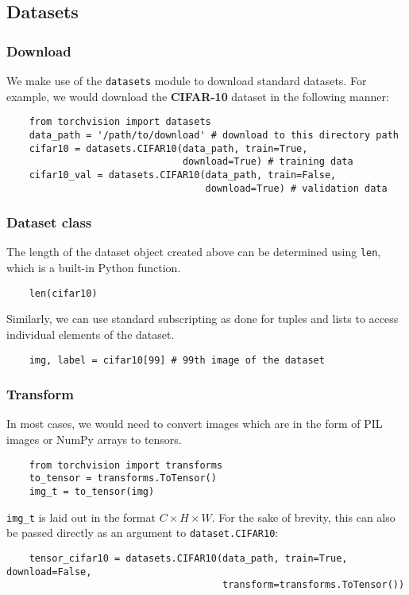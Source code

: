 \documentclass[11pt]{article}
\begin{document}
\subsection{Datasets}
\label{sec:org9c37bc9}
\subsubsection{Download}
\label{sec:org9ac6975}
We make use of the \texttt{datasets} module to download standard datasets. For example, we would download the \textbf{CIFAR-10} dataset in the following manner:
\begin{verbatim}
    from torchvision import datasets
    data_path = '/path/to/download' # download to this directory path
    cifar10 = datasets.CIFAR10(data_path, train=True,
                               download=True) # training data
    cifar10_val = datasets.CIFAR10(data_path, train=False,
                                   download=True) # validation data
\end{verbatim}

\subsubsection{Dataset class}
\label{sec:orgd928971}
The length of the dataset object created above can be determined using \texttt{len}, which is a built-in Python function.
\begin{verbatim}
    len(cifar10)
\end{verbatim}
Similarly, we can use standard subscripting as done for tuples and lists to access individual elements of the dataset.
\begin{verbatim}
    img, label = cifar10[99] # 99th image of the dataset
\end{verbatim}

\subsubsection{Transform}
\label{sec:org53b57e7}
In most cases, we would need to convert images which are in the form of PIL images or NumPy arrays to tensors.
\begin{verbatim}
    from torchvision import transforms
    to_tensor = transforms.ToTensor()
    img_t = to_tensor(img)
\end{verbatim}
\texttt{img\_t} is laid out in the format \(C\times H\times W\). For the sake of brevity, this can also be passed directly as an argument to \texttt{dataset.CIFAR10}:
\begin{verbatim}
    tensor_cifar10 = datasets.CIFAR10(data_path, train=True, download=False,
                                      transform=transforms.ToTensor())
\end{verbatim}
\end{document}
